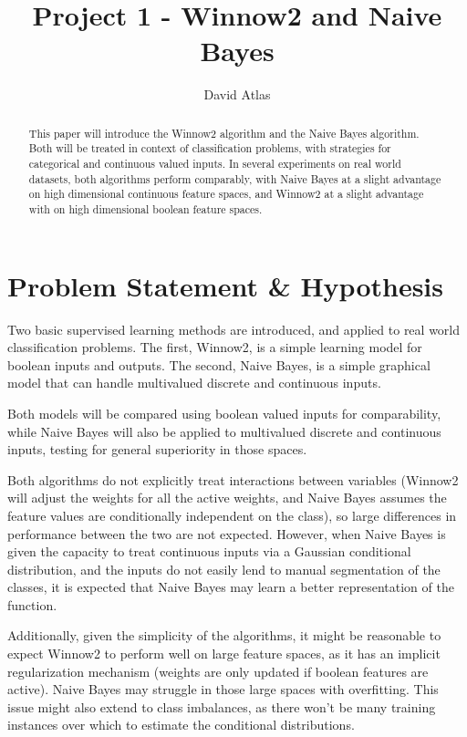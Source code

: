 \documentclass{amsart}
\title{Project 1 - Winnow2 and Naive Bayes}
\author{David Atlas}
\begin{document}
    \begin{abstract}
        This paper will introduce the Winnow2 algorithm and the Naive Bayes algorithm. Both will be treated in
        context of classification problems, with strategies for categorical and continuous valued inputs.
        In several experiments on real world datasets, both algorithms perform comparably,
        with Naive Bayes at a slight advantage on high dimensional continuous feature spaces,
        and Winnow2 at a slight advantage with on high dimensional boolean feature spaces.
    \end{abstract}
    \maketitle
    \section{Problem Statement \& Hypothesis}
    Two basic supervised learning methods are introduced, and applied to real world classification problems.
    The first, Winnow2, is a simple learning model for boolean inputs and outputs. The second,
    Naive Bayes, is a simple graphical model that can handle multivalued discrete and continuous inputs.

    Both models will be compared using boolean valued inputs for comparability, while Naive Bayes will also be applied
    to multivalued discrete and continuous inputs, testing for general superiority in those spaces.

    Both algorithms do not explicitly treat interactions between variables (Winnow2 will adjust the weights
    for all the active weights, and Naive Bayes assumes the feature values are conditionally independent on the class),
    so large differences in performance between the two are not expected. However, when Naive Bayes is given the
    capacity to treat continuous inputs via a Gaussian conditional distribution, and the inputs do not easily lend to
    manual segmentation of the classes, it is expected that Naive Bayes may learn a better representation of the function.

    Additionally, given the simplicity of the algorithms, it might be reasonable to expect Winnow2 to perform well on
    large feature spaces, as it has an implicit regularization mechanism (weights are only updated if boolean
    features are active). Naive Bayes may struggle in those large spaces with overfitting. This issue might also extend to
    class imbalances, as there won't be many training instances over which to estimate the conditional distributions.
\end{document}
